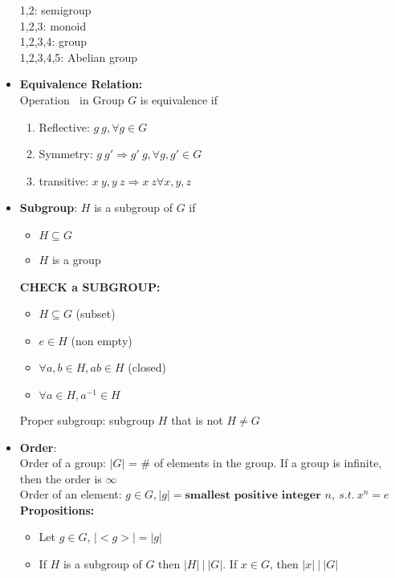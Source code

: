 \documentclass[12pt]{article}
\begin{document}
\begin{itemize}
        1,2: semigroup\\
        1,2,3: monoid\\
        1,2,3,4: group\\
        1,2,3,4,5: Abelian group
        \item \textbf{Equivalence Relation:}\\
        Operation $~$ in Group $G$ is equivalence if 
        \begin{enumerate}
            \item Reflective: $g ~ g, \forall g \in G$
            \item Symmetry: $g ~ g' \Rightarrow g' ~ g, \forall g,g' \in G$
            \item transitive: $x~y, y~z \Rightarrow x ~ z \forall x,y,z$
        \end{enumerate}
        \item \textbf{Subgroup}: $H$ is a subgroup of $G$ if
        \begin{itemize}
            \item $H \subseteq G$
            \item $H$ is a group
        \end{itemize}
        \textbf{CHECK a SUBGROUP:}
        \begin{itemize}
            \item $H \subseteq G$ (subset)
            \item $e \in H$ (non empty)
            \item $\forall a,b \in H, ab \in H$ (closed)
            \item $\forall a \in H, a^{-1} \in H$
        \end{itemize}
        Proper subgroup: subgroup $H$ that is not $H \ne G$
        \item \textbf{Order}:\\
        Order of a group: $|G|$ = \# of elements in the group. If a group is infinite, then the order is $\infty$\\
        Order of an element: $g\in G, |g| = \textbf{smallest positive integer }n, \ s.t. \ x^n = e$\\
        \textbf{Propositions:}
        \begin{itemize}
            \item Let $g \in G$, $|<g>| = |g|$
            \item If $H$ is a subgroup of $G$ then $|H| \ | \ |G|$. If $x \in G$, then $|x| \ | \ |G|$
        \end{itemize}

\end{itemize}
\end{document}
